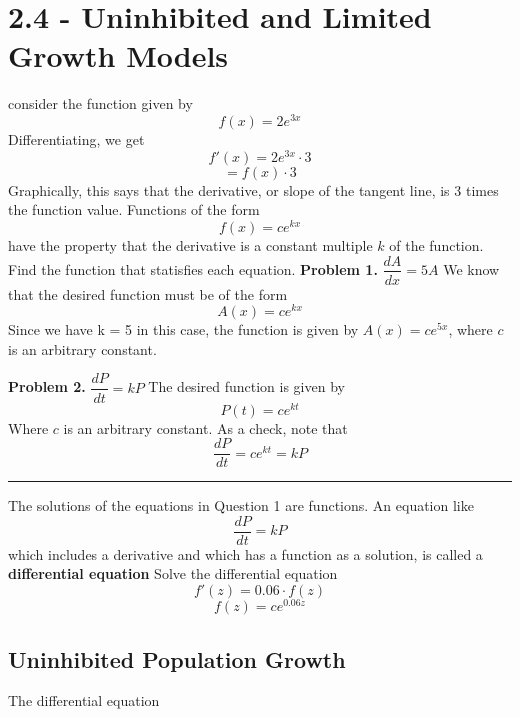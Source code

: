 \documentclass{report}
\begin{document}
\section*{2.4 - Uninhibited and Limited Growth Models}
consider the function given by
$$ f(x) = 2e^{3x}$$
Differentiating, we get
$$ f'(x) = 2e^{3x} \cdot 3$$
$$ = f(x) \cdot 3$$
\bigbreka \noindent
Graphically, this says that the derivative, or slope of the tangent line, is 3 times the function value.
\bigbreak \noindent
Functions of the form 
$$f(x) = ce^{kx}$$
have the property that the derivative is a constant multiple $k$ of the function.
\bigbreak \noindent
{}
\q
Find the function that statisfies each equation.
\bigbreak \noindent
\textbf{Problem 1.} $ \dfrac{dA}{dx} = 5A$
\bigbreak \noindent
We know that the desired function must be of the form
$$ A(x) = ce^{kx}$$
Since we have k = 5 in this case, the function is given by $A(x) = ce^{5x}$, where $c$ is an arbitrary constant.

\pagebreak
\noindent\textbf{Problem 2.} $\dfrac{dP}{dt} = kP$
\bigbreak \noindent
The desired function is given by
$$ P(t) = ce^{kt}$$
Where $c$ is an arbitrary constant. As a check, note that
$$ \dfrac{dP}{dt} = ce^{kt} = kP$$
\bigbreak \noindent
\hrule
\bigbreak \noindent
The solutions of the equations in Question 1 are functions. An equation like
$$ \dfrac{dP}{dt} = kP$$
which includes a derivative and which has a function as a solution, is called a \textbf{differential equation}
\bigbreak \noindent
\q
Solve the differential equation
$$ f'(z) = 0.06 \cdot f(z)$$
\sol
$$ f(z) = ce^{0.06z}$$

\bigbreak \noindent
\subsection*{Uninhibited Population Growth}
The differential equation
\end{document}
